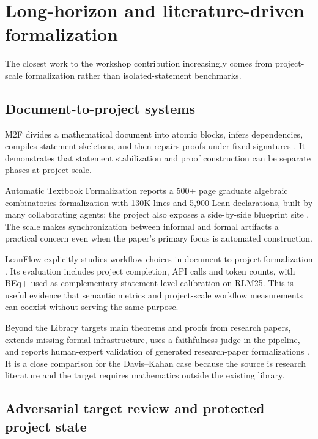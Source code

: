 \documentclass[11pt]{article}
\begin{document}
\section{Long-horizon and literature-driven formalization}

The closest work to the workshop contribution increasingly comes from
project-scale formalization rather than isolated-statement benchmarks.

\subsection{Document-to-project systems}

M2F divides a mathematical document into atomic blocks, infers dependencies,
compiles statement skeletons, and then repairs proofs under fixed signatures
\citep{wang2026m2f}.  It demonstrates that statement stabilization and proof
construction can be separate phases at project scale.

Automatic Textbook Formalization reports a 500+ page graduate algebraic
combinatorics formalization with 130K lines and 5,900 Lean declarations, built
by many collaborating agents; the project also exposes a side-by-side blueprint
site \citep{gloeckle2026textbook}.  The scale makes synchronization between
informal and formal artifacts a practical concern even when the paper's primary
focus is automated construction.

LeanFlow explicitly studies workflow choices in document-to-project
formalization \citep{milikic2026leanflow}.  Its evaluation includes project
completion, API calls and token counts, with BEq+ used as complementary
statement-level calibration on RLM25.  This is useful evidence that semantic
metrics and project-scale workflow measurements can coexist without serving the
same purpose.

Beyond the Library targets main theorems and proofs from research papers,
extends missing formal infrastructure, uses a faithfulness judge in the
pipeline, and reports human-expert validation of generated research-paper
formalizations \citep{moakhar2026beyondlibrary}.  It is a close comparison for
the Davis--Kahan case because the source is research literature and the target
requires mathematics outside the existing library.

\subsection{Adversarial target review and protected project state}
\end{document}
